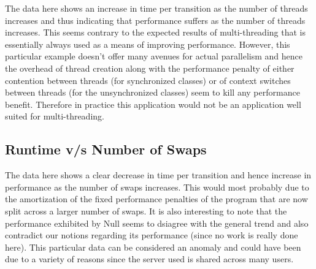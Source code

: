 The data here shows an increase in time per transition as the number of threads increases and thus indicating that performance suffers as the number of threads increases. This seems contrary to the expected results of multi-threading that is essentially always used as a means of improving performance. However, this particular example doesn't offer many avenues for actual parallelism and hence the overhead of thread creation along with the performance penalty of either contention between threads (for synchronized classes) or of context switches between threads (for the unsynchronized classes) seem to kill any performance benefit. Therefore in practice this application would not be an application well suited for multi-threading. 

\subsection{Runtime v/s Number of Swaps}
\begin{table}[!htbp]
\centering
{}
\end{table}

The data here shows a clear decrease in time per transition and hence increase in performance as the number of swaps increases. This would most probably due to the amortization of the fixed performance penalties of the program that are now split across a larger number of swaps. It is also interesting to note that the performance exhibited by Null seems to dsiagree with the general trend and also contradict our notions regarding its performance (since no work is really done here). This particular data can be considered an anomaly and could have been due to a variety of reasons since the server used is shared across many users.

